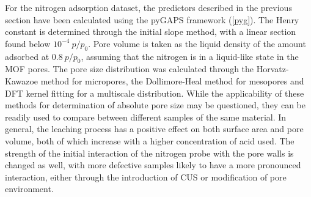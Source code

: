 For the nitrogen adsorption dataset, the predictors described in the 
previous section have been calculated using the pyGAPS framework
(\autoref{pyg}). The Henry constant is determined through the 
initial slope method, with a linear section found below 
\(10^{-4}~p/p_0\). Pore volume is taken as the liquid density
of the amount adsorbed at \(0.8~p/p_0\), assuming that the 
nitrogen is in a liquid-like state in the MOF pores. The pore
size distribution was calculated through the Horvatz-Kawazoe
method for micropores, the Dollimore-Heal method for mesopores
and DFT kernel fitting for a multiscale distribution. While 
the applicability of these methods for determination of absolute
pore size may be questioned, they can be readily used to
compare between different samples of the same material.
In general, the leaching process has a positive effect on 
both surface area and pore volume, both of which increase 
with a higher concentration of acid used. The strength of 
the initial interaction of the nitrogen probe with the pore 
walls is changed as well, with more defective samples likely
to have a more pronounced interaction, either through the introduction
of CUS or modification of pore environment.

